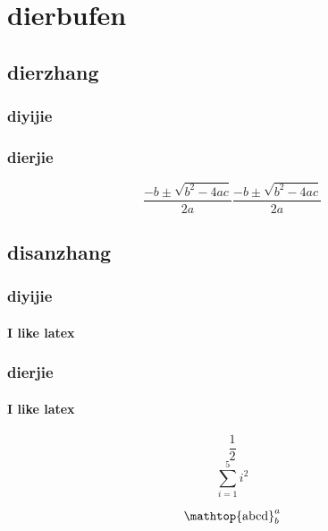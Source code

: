 \documentclass{book} %
\newcommand{\fc}{\frac}
\begin{document}
\part{dierbufen}
\chapter{dierzhang}
\section{diyijie}
\section{dierjie}

\begin{subequations}
	\begin{equation}
	\boxed{
		\frac{{ - b \pm \sqrt {{b^2} - 4ac} }}{{2a}}
	}
	\end{equation}
	\begin{equation}
	\frac{{ - b \pm \sqrt {{b^2} - 4ac} }}{{2a}}
	\end{equation}
\end{subequations}

\chapter{disanzhang}
\section{diyijie}
\subsection{I like latex}

\section{dierjie}
\subsection{I like latex}
\[\fc{1}{2}\]
\[\sum^5_{i=1}i^2\]

\[\mathtop{{\rm abcd}}^a_b\]
\end{document}
